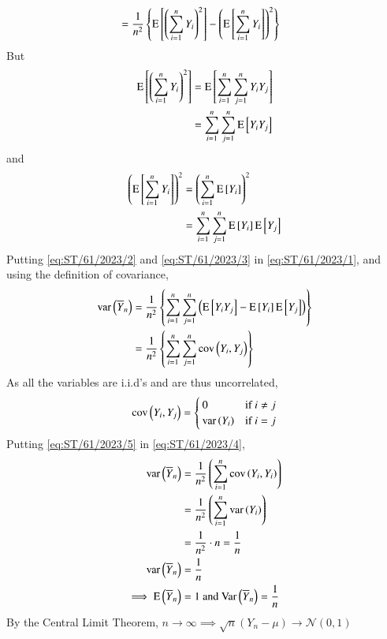 \documentclass[journal,12pt,twocolumn]{IEEEtran}
\begin{document}
\begin{enumerate}
\begin{align}
    &= \frac{1}{n^2} \cbrak{\text{E}\sbrak{\brak{\sum_{i=1}^{n} Y_i}^2} - \brak{\text{E}\sbrak{\sum_{i=1}^{n} Y_i}}^2}\label{eq:ST/61/2023/1}
\end{align}
But
\begin{align}
    \text{E}\sbrak{\brak{\sum_{i=1}^{n} Y_i}^2} &= \text{E}\sbrak{\sum_{i=1}^{n} \sum_{j=1}^{n} Y_iY_j}\\
    &= \sum_{i=1}^{n} \sum_{j=1}^{n} \text{E}\sbrak{Y_iY_j} \label{eq:ST/61/2023/2}
\end{align}
and 
\begin{align}
    \brak{\text{E}\sbrak{\sum_{i=1}^{n} Y_i}}^2 &= \brak{\sum_{i=1}^{n} \text{E}\sbrak{Y_i}}^2\\
    &= \sum_{i=1}^{n} \sum_{j=1}^{n} \text{E}\sbrak{Y_i} \text{E}\sbrak{Y_j} \label{eq:ST/61/2023/3}
\end{align}
Putting \eqref{eq:ST/61/2023/2} and \eqref{eq:ST/61/2023/3} in \eqref{eq:ST/61/2023/1}, and using the definition of covariance,
\begin{align}
    \text{var}\brak{\overline{Y}_n} &= \frac{1}{n^2} \cbrak{\sum_{i=1}^{n} \sum_{j=1}^{n} \brak{\text{E}\sbrak{Y_iY_j} - \text{E}\sbrak{Y_i} \text{E}\sbrak{Y_j}}}\\
    &= \frac{1}{n^2} \cbrak{\sum_{i=1}^{n} \sum_{j=1}^{n} \text{cov}\brak{Y_i, Y_j}} \label{eq:ST/61/2023/4}
\end{align}
As all the variables are i.i.d's and are thus uncorrelated,
\begin{align}
    \text{cov}\brak{Y_i, Y_j} =
    \begin{cases}
        0 & \text{if } i \ne j\\
        \text{var}\brak{Y_i} & \text{if } i = j
    \end{cases}\label{eq:ST/61/2023/5}
\end{align}
Putting \eqref{eq:ST/61/2023/5} in \eqref{eq:ST/61/2023/4},
\begin{align}
    \text{var}\left(\overline{Y}_n\right) &= \frac{1}{n^2} \left(\sum_{i=1}^{n} \text{cov}\left(Y_i, Y_i\right)\right)\\
     &= \frac{1}{n^2} \left(\sum_{i=1}^{n} \text{var}\left(Y_i\right)\right)\\
     &= \frac{1}{n^2} \cdot n = \frac{1}{n}\\
\text{var}\left(\overline{Y}_n\right) &= \frac{1}{n} \\
\implies \mathrm{E}\left(\overline{Y}_n\right) &= 1 \text{ and } \mathrm{Var}\left(\overline{Y}_n\right) = \frac{1}{n}  
\end{align}
By the Central Limit Theorem, $n \to \infty \implies \sqrt{n} (Y_n - \mu) \xrightarrow{} \mathcal{N}(0, 1)$

\end{enumerate}
\end{document}
